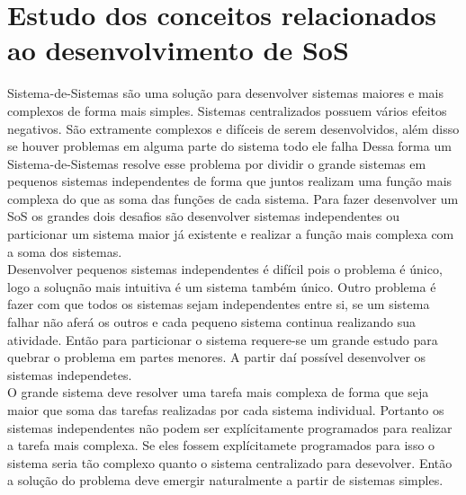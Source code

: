 \documentclass{article}
\begin{document}
\section{Estudo dos conceitos relacionados ao desenvolvimento de SoS}
Sistema-de-Sistemas são uma solução para desenvolver sistemas maiores e mais complexos de forma mais simples. Sistemas centralizados possuem vários efeitos negativos. São extramente complexos e difíceis de serem desenvolvidos, além disso se houver problemas em alguma parte do sistema todo ele falha Dessa forma um Sistema-de-Sistemas resolve esse problema por dividir o grande sistemas em pequenos sistemas independentes de forma que juntos realizam uma função mais complexa do que as soma das funções de cada sistema. Para fazer desenvolver um SoS os grandes dois desafios são desenvolver sistemas independentes ou particionar um sistema maior já existente e realizar a função mais complexa com a soma dos sistemas.\\
Desenvolver pequenos sistemas independentes é difícil pois o problema é único, logo a soluçnão mais intuitiva é um sistema também único. Outro problema é fazer com que todos os sistemas sejam independentes entre si, se um sistema falhar não aferá os outros e cada pequeno sistema continua realizando sua atividade. Então para particionar o sistema requere-se um grande estudo para quebrar o problema em partes menores. A partir daí possível desenvolver os sistemas independetes.\\
O grande sistema deve resolver uma tarefa mais complexa de forma que seja maior que soma das tarefas realizadas por cada sistema individual. Portanto os sistemas independentes não podem ser explícitamente programados para realizar a tarefa mais complexa. Se eles fossem explícitamete programados para isso o sistema seria tão complexo quanto o sistema centralizado para desevolver. Então a solução do problema deve emergir naturalmente a partir de sistemas simples.\\
\end{document}
